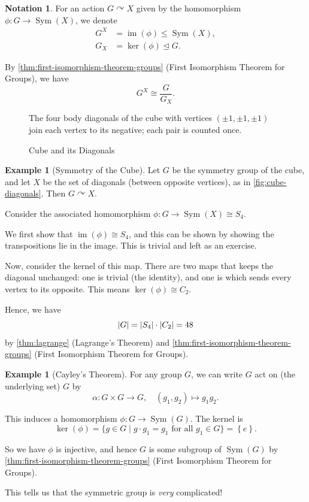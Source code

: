 \documentclass{article}
\theoremstyle{definition}
\newtheorem{example}[theorem]{Example}
\newtheorem{notation}[theorem]{Notation}
\theoremstyle{remark}
\DeclarePairedDelimiter{\abs}{\lvert}{\rvert}
\newcommand{\pqty}[1]{\left(#1\right)}
\newcommand{\Bqty}[1]{\left\{#1\right\}}
\newcommand{\set}[2]{\{#1\mid #2\}}
\newcommand{\flatfrac}[2]{\frac{#1}{#2}}
\newcommand{\functiondomain}[3]{#1:#2\to #3}
\newcommand{\function}[5]{#1:#2\to #3,\quad #4\mapsto #5}
\newcommand{\isomorphic}{\cong}
\newcommand{\normalsub}{\trianglelefteq}
\newcommand{\subgroup}{\leq}
\newcommand{\actson}{\curvearrowright}
\newcommand{\Sym}{\operatorname{Sym}}
\newcommand{\img}{\operatorname{im}}
\begin{document}
\begin{notation}
    For an action \(G \actson X\) given by the homomorphism \(\functiondomain{\phi}{G}{\Sym\pqty{X}}\), we denote
    \begin{align*}
        G^X &= \img \pqty{\phi} \subgroup \Sym\pqty{X}, \\
        G_X &= \ker \pqty{\phi} \normalsub G.
    \end{align*}
\end{notation}

By \autoref{thm:first-isomorphism-theorem-groups} (First Isomorphism Theorem for Groups), we have
\[
    G^X \isomorphic \flatfrac{G}{G_X}.
\]

\begin{figure}[ht!]
    \centering
    \par The four body diagonals of the cube with vertices $(\pm1,\pm1,\pm1)$ join each vertex to its negative; each pair is counted once.\par
    \caption{Cube and its Diagonals}
    \label{fig:cube-diagonals}
\end{figure}

\begin{example}[Symmetry of the Cube]
    \label{ex:symmetry-of-cube}
    Let \(G\) be the symmetry group of the cube, and let \(X\) be the set of diagonals (between opposite vertices), as in \autoref{fig:cube-diagonals}. Then \(G \actson X\).

    Consider the associated  homomorphism \(\functiondomain{\phi}{G}{\Sym\pqty{X} \isomorphic S_4}\).
    
    We first show that \(\img \pqty{\phi} \isomorphic S_4\), and this can be shown by showing the transpositions lie in the image. This is trivial and left as an exercise.

    Now, consider the kernel of this map. There are two maps that keeps the diagonal unchanged: one is trivial (the identity), and one is which sends every vertex to its opposite. This means \(\ker \pqty{\phi} \isomorphic C_2\).

    Hence, we have
    \[
        \abs{G} = \abs{S_4} \cdot \abs{C_2} = 48
    \]
    by \autoref{thm:lagrange} (Lagrange's Theorem) and \autoref{thm:first-isomorphism-theorem-groups} (First Isomorphism Theorem for Groups).
\end{example}

\begin{example}[Cayley's Theorem]
    \label{ex:cayley-theorem}%
    For any group \(G\), we can write \(G\) act on (the underlying set) \(G\) by
    \[
        \function{\alpha}{G \times G}{G}{\pqty{g_1, g_2}}{g_1 g_2.}
    \]

    This induces a homomorphism \(\functiondomain{\phi}{G}{\Sym\pqty{G}}\). The kernel is
    \[
        \ker\pqty{\phi} = \set{g \in G}{g \cdot g_1 = g_1 \text{ for all }g_1 \in G} = \Bqty{e}.
    \]

    So we have \(\phi\) is injective, and hence \(G\) is some subgroup of \(\Sym\pqty{G}\) by \autoref{thm:first-isomorphism-theorem-groups} (First Isomorphism Theorem for Groups).

    This tells us that the symmetric group is \emph{very} complicated!
\end{example}
\end{document}
